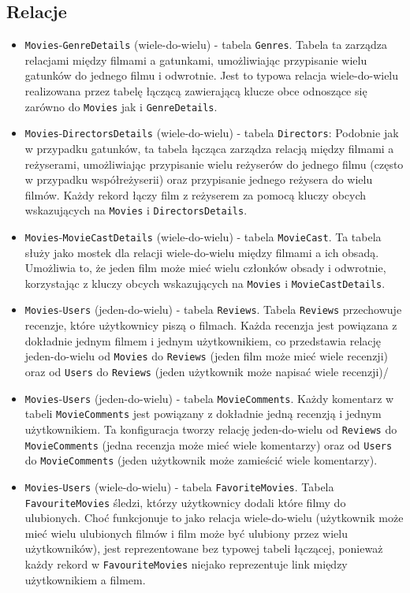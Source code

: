 \documentclass[../main.tex]{subfiles}
\begin{document}
\subsection{Relacje}
\begin{itemize}
	\item \texttt{Movies}-\texttt{GenreDetails} (wiele-do-wielu) - tabela \texttt{Genres}. Tabela ta zarządza relacjami między filmami a gatunkami, umożliwiając przypisanie wielu gatunków do jednego filmu i odwrotnie. Jest to typowa relacja wiele-do-wielu realizowana przez tabelę łączącą zawierającą klucze obce odnoszące się zarówno do \texttt{Movies} jak i \texttt{GenreDetails}.
	\item \texttt{Movies}-\texttt{DirectorsDetails} (wiele-do-wielu) - tabela \texttt{Directors}: Podobnie jak w przypadku gatunków, ta tabela łącząca zarządza relacją między filmami a reżyserami, umożliwiając przypisanie wielu reżyserów do jednego filmu (często w przypadku współreżyserii) oraz przypisanie jednego reżysera do wielu filmów. Każdy rekord łączy film z reżyserem za pomocą kluczy obcych wskazujących na \texttt{Movies} i \texttt{DirectorsDetails}.
	\item \texttt{Movies}-\texttt{MovieCastDetails} (wiele-do-wielu) - tabela \texttt{MovieCast}. Ta tabela służy jako mostek dla relacji wiele-do-wielu między filmami a ich obsadą. Umożliwia to, że jeden film może mieć wielu członków obsady i odwrotnie, korzystając z kluczy obcych wskazujących na \texttt{Movies} i \texttt{MovieCastDetails}.
	\item \texttt{Movies}-\texttt{Users} (jeden-do-wielu) - tabela \texttt{Reviews}. Tabela \texttt{Reviews} przechowuje recenzje, które użytkownicy piszą o filmach. Każda recenzja jest powiązana z dokładnie jednym filmem i jednym użytkownikiem, co przedstawia relację jeden-do-wielu od \texttt{Movies} do \texttt{Reviews} (jeden film może mieć wiele recenzji) oraz od \texttt{Users} do \texttt{Reviews} (jeden użytkownik może napisać wiele recenzji)/
	\item \texttt{Movies}-\texttt{Users} (jeden-do-wielu) - tabela \texttt{MovieComments}. Każdy komentarz w tabeli \texttt{MovieComments} jest powiązany z dokładnie jedną recenzją i jednym użytkownikiem. Ta konfiguracja tworzy relację jeden-do-wielu od \texttt{Reviews} do \texttt{MovieComments} (jedna recenzja może mieć wiele komentarzy) oraz od \texttt{Users} do \texttt{MovieComments} (jeden użytkownik może zamieścić wiele komentarzy).
	\item \texttt{Movies}-\texttt{Users} (wiele-do-wielu) - tabela \texttt{FavoriteMovies}. Tabela \texttt{FavouriteMovies} śledzi, którzy użytkownicy dodali które filmy do ulubionych. Choć funkcjonuje to jako relacja wiele-do-wielu (użytkownik może mieć wielu ulubionych filmów i film może być ulubiony przez wielu użytkowników), jest reprezentowane bez typowej tabeli łączącej, ponieważ każdy rekord w \texttt{FavouriteMovies} niejako reprezentuje link między użytkownikiem a filmem.
\end{itemize}
\end{document}
